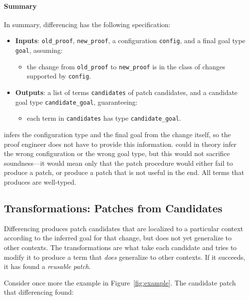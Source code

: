 \paragraph{Summary}
In summary, differencing has the following specification:

\begin{itemize}
\item \textbf{Inputs}: \lstinline{old_proof}, \lstinline{new_proof}, a configuration \lstinline{config}, and a final goal type \lstinline{goal}, assuming:
\begin{itemize}
\item the change from \lstinline{old_proof} to \lstinline{new_proof} is in the class of changes supported by \lstinline{config}.
\end{itemize}
\item \textbf{Outputs}: a list of terms \lstinline{candidates} of patch candidates, and a candidate goal type \lstinline{candidate_goal}, guaranteeing:
\begin{itemize}
\item each term in \lstinline{candidates} has type \lstinline{candidate_goal}.
\end{itemize}
\end{itemize}
\sysname infers the configuration type and the final goal from the change itself, so the proof engineer does not have to provide this information.
\sysname could in theory infer the wrong configuration or the wrong goal type, but this would not sacrifice soundness---it would mean only that
the patch procedure would either fail to produce a patch, or produce a patch that is not useful in the end.
All terms that \sysname produces are well-typed. %

\subsection{Transformations: Patches from Candidates}
\label{sec:pumpkin-spec-trans}

Differencing produces patch candidates that are localized to a particular context according to the inferred goal for that change,
but does not yet generalize to other contexts.
The transformations are what take each candidate and tries to modify it to produce a term that \textit{does} generalize to other contexts.
If it succeeds, it has found a \textit{reusable patch}.

Consider once more the example in Figure~\ref{fig:example}.
The candidate patch that differencing found:

